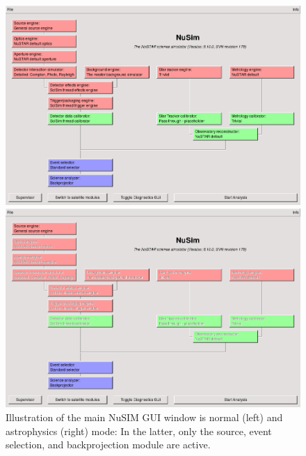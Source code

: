 \begin{figure}[bt]
  \begin{minipage}[c]{0.48\linewidth}
    \begin{center}
      \includegraphics[scale=0.27]{images/MainWindowNormalMode.png}  
    \end{center}
  \end{minipage}
  \hspace{0.04\linewidth}
  \begin{minipage}[c]{0.48\linewidth}
    \begin{center}
      \includegraphics[scale=0.27]{images/MainWindowAstrophysicsMode.png}  
    \end{center}
  \end{minipage}
  \caption{\label{fig:mainwindowmodes} Illustration of the main NuSIM GUI window is normal (left) and astrophysics (right) mode: In the latter, only the source, event selection, and backprojection module are active. }
\end{figure}


